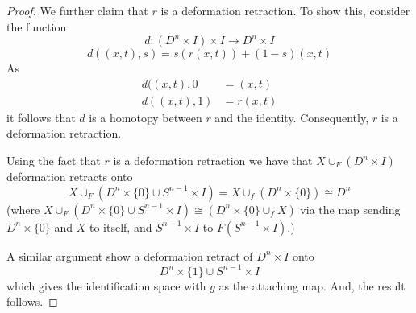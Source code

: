 \documentclass{book}
\begin{document}
\begin{enumerate}[(1)]
\begin{proof}
            We further claim that $r$ is a deformation retraction. To show this, consider the function 
            \[d: (D^n \times I) \times I \rightarrow D^n \times I\]
            \[d((x,t),s) = s (r(x,t)) + (1-s)(x,t) \]
            As 
            \begin{align*}
                d((x,t),0 & = (x,t) \\
                d((x,t), 1) & = r(x,t)
            \end{align*}
            it follows that $d$ is a homotopy between $r$ and the identity. Consequently, $r$ is a deformation retraction. 
            \par Using the fact that $r$ is a deformation retraction we have that $X \cup_F (D^n \times I)$ deformation retracts onto 
            \[X \cup_F (D^n \times \{0\} \cup S^{n-1} \times I) = X \cup_f (D^n \times \{0\}) \cong D^n   \]
            (where $X \cup_F (D^n \times \{0\} \cup S^{n-1} \times I) \cong (D^n \times \{0\} \cup_f X)$ via the map sending $D^n \times \{0\}$ and $X$ to itself, and $S^{n-1} \times I$ to $F(S^{n-1} \times I)$.)
            \par A similar argument show a deformation retract of $D^n \times I$ onto 
            \[D^n \times \{1\} \cup S^{n-1} \times I\]
            which gives the identification space with $g$ as the attaching map. And, the result follows. 
        \end{proof}


\end{enumerate}
\end{document}
